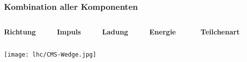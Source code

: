 \begin{frame}[t]
  \frametitle{Kombination aller Komponenten}
  \vskip0.3cm
  \begin{columns}
    \begin{column}{0.18\textwidth}
      \begin{block}{}
        \centering
        \textbf{Richtung}
      \end{block}
    \end{column}
    \begin{column}{0.025\textwidth}
    \end{column}
    \begin{column}{0.18\textwidth}
      \begin{block}{}
        \centering
        \textbf{Impuls}
      \end{block}
    \end{column}
    \begin{column}{0.025\textwidth}
    \end{column}
    \begin{column}{0.18\textwidth}
      \begin{block}{}
        \centering
        \textbf{Ladung}
      \end{block}
    \end{column}
    \begin{column}{0.025\textwidth}
    \end{column}
    \begin{column}{0.18\textwidth}
      \begin{block}{}
        \centering
        \textbf{Energie}
      \end{block}
    \end{column}
    \begin{column}{0.02\textwidth}
    \end{column}
    \begin{column}{0.18\textwidth}
      \begin{block}{}
        \centering
        \textcolor{white}{g}\textbf{Teilchenart}\textcolor{white}{g}
      \end{block}
    \end{column}
    \begin{column}{0.005\textwidth}
    \end{column}
  \end{columns}
  \vskip0.25cm
  \begin{center}
    \texttt{[image: lhc/CMS-Wedge.jpg]}
  \end{center}
\end{frame}

